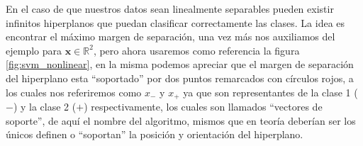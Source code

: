 En el caso de que nuestros datos sean linealmente separables pueden existir infinitos hiperplanos que puedan clasificar correctamente las clases. La idea es encontrar el máximo margen de separación, una vez más nos auxiliamos del ejemplo para $\mathbf{x} \in \mathbb{R}^2$, pero ahora usaremos como referencia la figura \ref{fig:svm_nonlinear}, en la misma podemos apreciar que el margen de separación del hiperplano esta ``soportado'' por dos puntos remarcados con círculos rojos, a los cuales nos referiremos como $x_{-}$ y $x_{+}$ ya que son representantes de la clase 1 ($-$) y la clase 2 ($+$) respectivamente, los cuales son llamados ``vectores de soporte'', de aquí el nombre del algoritmo, mismos que en teoría deberían ser los únicos definen o ``soportan'' la posición y orientación del hiperplano.

\begin{figure}
	\centering
\end{figure}
